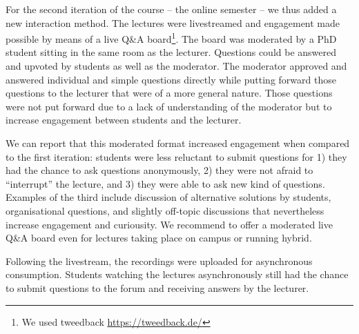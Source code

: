 For the second iteration of the course -- the online semester --
we thus added a new interaction method.
The lectures were livestreamed and
engagement made possible by means of a live Q\&A board\footnote{We used tweedback \url{https://tweedback.de/}}.
The board was moderated by a PhD student
sitting in the same room as the lecturer.
Questions could be answered and upvoted by students as well as the moderator.
The moderator approved and answered individual and simple questions directly while putting forward those questions to the lecturer that were of a more general nature.
Those questions were not put forward due to a lack of understanding of the moderator
but to increase engagement between students and the lecturer.

We can report that this moderated format increased engagement when compared to the first iteration:
students were less reluctant to submit questions for
1) they had the chance to ask questions anonymously,
2) they were not afraid to ``interrupt'' the lecture, and
3) they were able to ask new kind of questions.
Examples of the third include discussion of alternative solutions by students,
organisational questions,
and slightly off-topic discussions that nevertheless increase engagement and curiousity.
We recommend to offer a moderated live Q\&A board even for lectures taking place on campus or running hybrid.

Following the livestream,
the recordings were uploaded for asynchronous consumption.
Students watching the lectures asynchronously still had the chance to submit questions to the forum and receiving answers by the lecturer.

